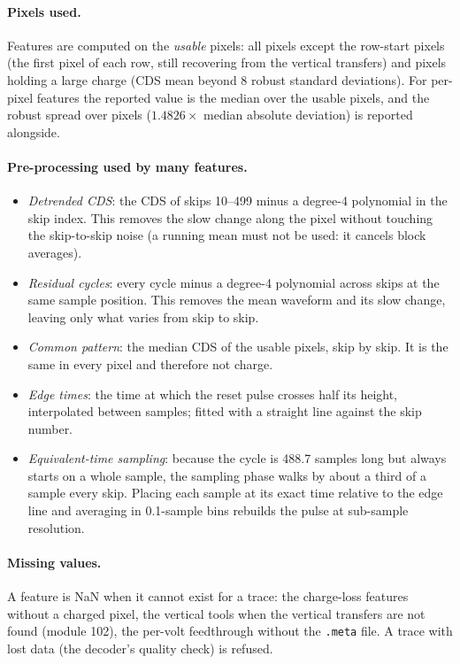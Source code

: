 \documentclass[10pt]{article}
\newcommand{\code}[1]{\texttt{#1}}
\begin{document}
\paragraph{Pixels used.} Features are computed on the \emph{usable} pixels: all pixels except the row-start pixels (the first
pixel of each row, still recovering from the vertical transfers) and pixels holding a large charge (CDS mean beyond 8 robust
standard deviations). For per-pixel features the reported value is the median over the usable pixels, and the robust spread
over pixels ($1.4826\times$ median absolute deviation) is reported alongside.

\paragraph{Pre-processing used by many features.}
\begin{itemize}
  \item \emph{Detrended CDS}: the CDS of skips 10--499 minus a degree-4 polynomial in the skip index. This removes the slow change
        along the pixel without touching the skip-to-skip noise (a running mean must not be used: it cancels block averages).
  \item \emph{Residual cycles}: every cycle minus a degree-4 polynomial across skips at the same sample position. This removes the
        mean waveform and its slow change, leaving only what varies from skip to skip.
  \item \emph{Common pattern}: the median CDS of the usable pixels, skip by skip. It is the same in every pixel and therefore not charge.
  \item \emph{Edge times}: the time at which the reset pulse crosses half its height, interpolated between samples; fitted with a
        straight line against the skip number.
  \item \emph{Equivalent-time sampling}: because the cycle is 488.7 samples long but always starts on a whole sample, the sampling
        phase walks by about a third of a sample every skip. Placing each sample at its exact time relative to the edge line and
        averaging in 0.1-sample bins rebuilds the pulse at sub-sample resolution.
\end{itemize}

\paragraph{Missing values.} A feature is NaN when it cannot exist for a trace: the charge-loss features without a charged pixel,
the vertical tools when the vertical transfers are not found (module 102), the per-volt feedthrough without the \code{.meta}
file. A trace with lost data (the decoder's quality check) is refused.
\end{document}
